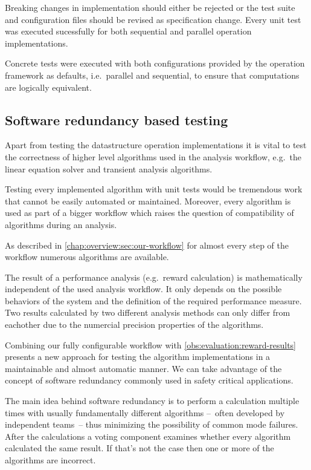 Breaking changes in implementation should either be rejected or the
test suite and configuration files should be revised as specification
change. Every unit test was executed sucessfully for both sequential
and parallel operation implementations.

Concrete tests were executed with both configurations provided by the
operation framework as defaults, i.e.~parallel and sequential, to
ensure that computations are logically equivalent.

\subsection{Software redundancy based testing}

Apart from testing the datastructure operation implementations it is
vital to test the correctness of higher level algorithms used in the
analysis workflow, e.g.\ the linear equation solver and transient
analysis algorithms.

Testing every implemented algorithm with unit tests would be
tremendous work that cannot be easily automated or maintained.
Moreover, every algorithm is used as part of a bigger workflow which
raises the question of compatibility of algorithms during an analysis.

As described in \cref{chap:overview:sec:our-workflow} for almost every
step of the workflow numerous algorithms are available.

\begin{obs}
  \label{obs:evaluation:reward-results}
  The result of a performance analysis (e.g.\ reward calculation) is
  mathematically independent of the used analysis workflow. It only
  depends on the possible behaviors of the system and the definition
  of the required performance measure. Two results calculated by two
  different analysis methods can only differ from eachother due to the
  numercial precision properties of the algorithms.
\end{obs}  

Combining our fully configurable workflow with
\cref{obs:evaluation:reward-results} presents a new approach for
testing the algorithm implementations in a maintainable and almost
automatic manner. We can take advantage of the concept of software
redundancy commonly used in safety critical applications.

The main idea behind software redundancy is to perform a calculation
multiple times with usually fundamentally different algorithms
--~often developed by independent teams~-- thus minimizing the
possibility of common mode failures. After the calculations a voting
component examines whether every algorithm calculated the same
result. If that's not the case then one or more of the algorithms are
incorrect.

